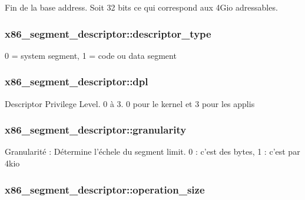 Fin de la base address. Soit 32 bits ce qui correspond aux 4\+Gio adressables. \hypertarget{structx86__segment__descriptor_adda0434239b7e6c6a68b8e7556e4bb2f}{
\subsubsection[{descriptor\+\_\+type}]{ x86\+\_\+segment\+\_\+descriptor\+::descriptor\+\_\+type}}\label{structx86__segment__descriptor_adda0434239b7e6c6a68b8e7556e4bb2f}
0 = system segment, 1 = code ou data segment \hypertarget{structx86__segment__descriptor_ab45e49c27bbe57a568d914bd13e45ef7}{
\subsubsection[{dpl}]{ x86\+\_\+segment\+\_\+descriptor\+::dpl}}\label{structx86__segment__descriptor_ab45e49c27bbe57a568d914bd13e45ef7}
Descriptor Privilege Level. 0 à 3. 0 pour le kernel et 3 pour les applis \hypertarget{structx86__segment__descriptor_a19d5da93d41a1ec3327cbd92ace8fa08}{
\subsubsection[{granularity}]{ x86\+\_\+segment\+\_\+descriptor\+::granularity}}\label{structx86__segment__descriptor_a19d5da93d41a1ec3327cbd92ace8fa08}
Granularité \+: Détermine l'échele du segment limit. 0 \+: c'est des bytes, 1 \+: c'est par 4kio \hypertarget{structx86__segment__descriptor_a40c320788bf23e3660d0def872cec94c}{
\subsubsection[{operation\+\_\+size}]{ x86\+\_\+segment\+\_\+descriptor\+::operation\+\_\+size}}\label{structx86__segment__descriptor_a40c320788bf23e3660d0def872cec94c}
